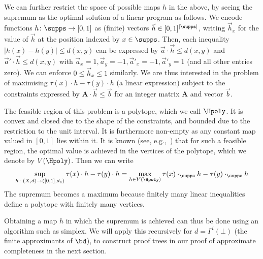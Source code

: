 \begin{remark}\label{rem:hfromLP}
	We can further restrict the space of possible maps \(h\) in the above, by seeing the supremum as the optimal solution of a linear program as follows.
	We encode functions \(h \colon \supps \to [0,1]\) as (finite) vectors \(\vec{h} \in [0,1]^{|\supps|}\), writing \(\vec{h}_x\) for the value of \(\vec{h}\) at the position indexed by \(x \in \supps\).
	Then, each inequality \(|h(x) - h(y)| \leq d(x,y)\) can be expressed by \(\vec{a} \cdot \vec{h} \leq d(x,y)\) and \(\vec{a}' \cdot \vec{h} \leq d(x,y)\) with \(\vec{a}_x = 1, \vec{a}_y = -1, \vec{a}'_x = -1, \vec{a}'_y = 1\) (and all other entries zero). We can enforce \(0 \leq \vec{h}_x \leq 1\) similarly.
	We are thus interested in the problem of maximising \(\tau(x) \cdot h - \tau(y) \cdot h\) (a linear expression) subject to the constraints expressed by \(\mathbf{A} \cdot \vec{h} \leq \vec{b}\) for an integer matrix \(\mathbf{A}\) and vector \(\vec{b}\).

	The feasible region of this problem is a polytope, which we call \(\Hpoly\). It is convex and closed due to the shape of the constraints, and bounded due to the restriction to the unit interval. It is furthermore non-empty as any constant map valued in \([0,1]\) lies within it.
	It is known (see, e.g.,~\cite{trustrum1971linear}) that for such a feasible region, the optimal value is achieved in the vertices of the polytope, which we denote by \(V(\Hpoly)\). Then we can write
	\begin{equation*}
		\sup_{h \colon (X,d) \to ([0,1],d_e)} \tau(x) \cdot h - \tau(y) \cdot h = \max_{h \in V(\Hpoly)} \tau(x) \cdot_\supps h - \tau(y) \cdot_\supps h
	\end{equation*}
	The supremum becomes a maximum because finitely many linear inequalities define a polytope with finitely many vertices.

	Obtaining a map \(h\) in which the supremum is achieved can thus be done using an algorithm such as simplex. We will apply this recursively for \(d = \Gamma^i(\bot)\) (the finite approximants of \(\bd\)), to construct proof trees in our proof of approximate completeness in the next section.
\end{remark}


